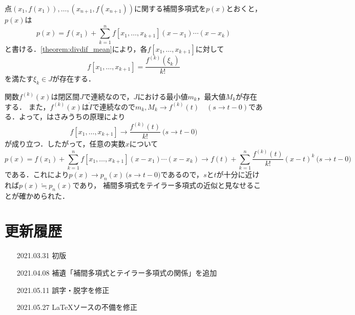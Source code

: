 \documentclass[a4paper]{ltjsarticle}
\theoremstyle{definition}
\newcommand{\plimas}[1]{\pod{#1}}
\begin{document}
点$(x_1,f(x_1)),\dots,(x_{n+1},f(x_{n+1}))$に関する補間多項式を$p(x)$とおくと，$p(x)$は
\[
  p(x) = f(x_1) + \sum_{k=1}^n f[x_1,\dots,x_{k+1}] (x-x_1) \cdots (x-x_k)
\]
と書ける．\cref{theorem:divdif_mean}により，各$f[x_1,\dots,x_{k+1}]$に対して
\[
  f[x_1,\dots,x_{k+1}] = \frac{f^{(k)}(\xi_k)}{k!}
\]
を満たす$\xi_k\in J$が存在する．

関数$f^{(k)}(x)$は閉区間$J$で連続なので，$J$における最小値$m_k$，最大値$M_k$が存在する．
また，$f^{(k)}(x)$は$\mathring{I}$で連続なので$m_k, M_k\to f^{(k)}(t)\quad (s\to t-0)$である．よって，はさみうちの原理により
\[
  f[x_1,\dots,x_{k+1}] \to \frac{f^{(k)}(t)}{k!}\plimas{s\to t-0}
\]
が成り立つ．したがって，任意の実数$x$について
\[
  p(x)=f(x_1)+\sum_{k=1}^n f[x_1,\dots,x_{k+1}](x-x_1)\cdots (x-x_k)\to f(t)+ \sum_{k=1}^n \frac{f^{(k)}(t)}{k!} (x-t)^k \plimas{s\to t-0}
\]
である．これにより$p(x)\to p_n(x)\plimas{s\to t-0}$であるので，$s$と$t$が十分に近ければ$p(x)\fallingdotseq p_n(x)$であり，
補間多項式をテイラー多項式の近似と見なせることが確かめられた．


\nocite{*}


\section*{更新履歴}
\begin{enumerate}[align=left]
  \item[2021.03.31] 初版
  \item[2021.04.08] 補遺「補間多項式とテイラー多項式の関係」を追加
  \item[2021.05.11] 誤字・脱字を修正
  \item[2021.05.27] \LaTeX ソースの不備を修正
\end{enumerate}
\end{document}
